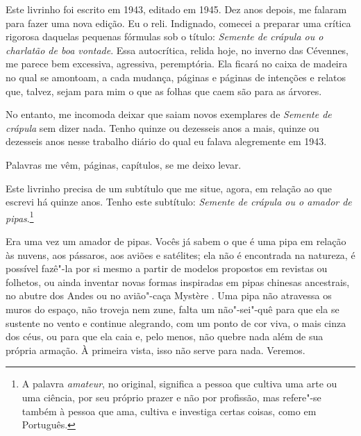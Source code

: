 \pagebreak
\thispagestyle{empty}
\movetooddpage
\thispagestyle{empty}
\begin{vplace}[0.25]


{\large{}}
\end{vplace}

\pagebreak
\thispagestyle{empty}

\movetooddpage

Este livrinho foi escrito em 1943, editado em 1945. Dez anos depois, me
falaram para fazer uma nova edição. Eu o reli. Indignado, comecei a
preparar uma crítica rigorosa daquelas pequenas fórmulas sob o título:
\emph{Semente de crápula ou o charlatão de boa vontade}. Essa
autocrítica, relida hoje, no inverno das Cévennes, me parece bem
excessiva, agressiva, peremptória. Ela ficará no caixa de madeira no
qual se amontoam, a cada mudança, páginas e páginas de intenções e
relatos que, talvez, sejam para mim o que as folhas que caem são para as
árvores.

No entanto, me incomoda deixar que saiam novos exemplares de
\emph{Semente de crápula} sem dizer nada. Tenho quinze ou dezesseis anos
a mais, quinze ou dezesseis anos nesse trabalho diário do qual eu falava
alegremente em 1943.

Palavras me vêm, páginas, capítulos, se me deixo levar.

Este livrinho precisa de um subtítulo que me situe, agora, em relação ao
que escrevi há quinze anos. Tenho este subtítulo: \emph{Semente de
crápula ou o amador de pipas}.\footnote{A palavra \emph{amateur}, no
  original, significa a pessoa que cultiva uma arte ou uma ciência, por
  seu próprio prazer e não por profissão, mas refere"-se também à pessoa
  que ama, cultiva e investiga certas coisas, como em Português.}

Era uma vez um amador de pipas. Vocês já sabem o que é uma pipa em
relação às nuvens, aos pássaros, aos aviões e satélites; ela não é
encontrada na natureza, é possível fazê"-la por si mesmo a partir de
modelos propostos em revistas ou folhetos, ou ainda inventar novas
formas inspiradas em pipas chinesas ancestrais, no abutre dos Andes ou
no avião"-caça Mystère . Uma pipa não atravessa os muros do espaço, não
troveja nem zune, falta um não"-sei"-quê para que ela se sustente no vento
e continue alegrando, com um ponto de cor viva, o mais cinza dos céus,
ou para que ela caia e, pelo menos, não quebre nada além de sua própria
armação. À primeira vista, isso não serve para nada. Veremos.

